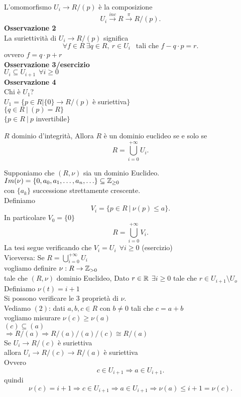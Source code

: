 \documentclass{article}
\begin{document}
 L'omomorfismo $U_i \rightarrow R/(p)$ è la composizione\\
 \[
	 U_i \xrightarrow{inc} R \xrightarrow{\pi} R/(p)
 .\] 
 \textbf{Osservazione 2}\\
 La suriettività di $U_i \rightarrow R/(p)$ significa 
 \[
	 \forall f\in R \ \exists q\in R, \ r \in U_i\ \ \text{ tali che } f - q\cdot p = r
 .\] 
 ovvero $f = q \cdot p + r$ \\
 \textbf{Osservazione 3/esercizio}\\
 $U_i\subseteq U_{i+1} \ \ \forall i\geq 0$ \\
 \textbf{Osservazione 4}\\
 Chi è $U_1$?\\
 $U_1 = \{p\in R | \{0\} \rightarrow R/(p)$ è suriettiva$\}$\\
 $\{q\in R \  | \ (p) = R\}$ \\
 $\{p\in R \ | \ p$ invertibile$\}$\\
 \begin{teo}
	 $R$ dominio d'integrità, Allora $R$ è un dominio euclideo se e solo se \[R = \bigcup^{+\infty}_{i=0}U_i.\]
 \end{teo}
 \begin{dimo}
 	Supponiamo che $(R,\nu)$ sia un dominio Euclideo.\\
	$Im(\nu) = \{0,a_0,a_1,\ldots,a_n,\ldots\}\subseteq\mathbb{Z}_{\geq0}$\\
con $\{a_k\}$ successione strettamente crescente.\\
Definiamo
\[
	V_i = \{p\in R  \ | \ \nu(p) \leq a \}
.\] 
In particolare $V_0 = \{0\}$\\
\[
R = \bigcup^{+\infty}_{i =0 }V_i
.\] 
La tesi segue verificando che $V_i = U_i \ \ \forall i\geq 0$ (esercizio)\\
Viceversa: Se $R = \bigcup^{+\infty}_{i =0}U_i$\\
vogliamo definire $\nu: R \rightarrow\mathbb{Z}_{>0}$\\
tale che $(R,\nu)$ dominio Euclideo, Dato $r\in \mathbb{R}$  $\exists i\geq 0$ tale che $r\in U_{i+1}\setminus U_o$ \\
Definiamo $\nu(t) = i+1$ \\
Si possono verificare le 3 proprietà di $\nu$.\\
Vediamo $(2)$: dati  $a,b,c\in R$ con  $b\neq 0$ tali che  $c = a + b$\\
vogliamo misurare  $\nu(c) \geq \nu(a)$\\
 $(c)\subseteq(a)$\\
  $ \Rightarrow R/(a) \Rightarrow R/(a)/(a)/(c)\cong R/(a)$ \\
  Se $U_i \rightarrow R/(c)$ è suriettiva\\
  allora $U_i \rightarrow R/(c) \rightarrow R/(a)$ è suriettiva\\
  Ovvero
  \[
	  c\in U_{i+1} \Rightarrow a\in U_{i+1}
  .\] 
  quindi 
   \[
	   \nu(c) = i + 1 \Rightarrow  c \in U_{i+1} \Rightarrow a\in U_{i+1} \Rightarrow \nu(a)\leq i+1 = \nu(c)
  .\] 
 \end{dimo}
\end{document}
